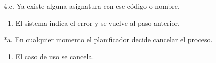 \begin{itemize}
\begin{itemize}
\begin{enumerate}
		\end{enumerate}
	\item[4.c.] Ya existe alguna asignatura con ese código o nombre.
		\begin{enumerate}
		\item El sistema indica el error y se vuelve al paso anterior.
		\end{enumerate}
	\item[*a.] En cualquier momento el planificador decide cancelar el proceso.
		\begin{enumerate}
		\item El caso de uso se cancela.
		\end{enumerate}
	\end{itemize}
\end{itemize}



